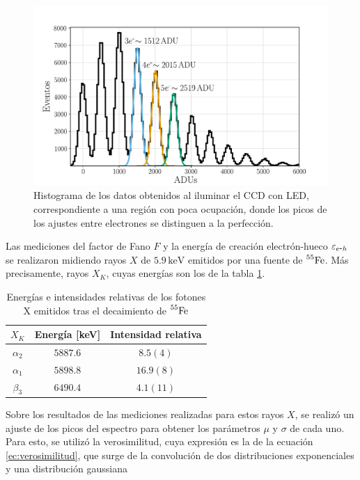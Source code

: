 \begin{figure}[H]
    \centering
        \includegraphics[scale=0.5]{Figs/ajuste_gaussiano_calibracion.pdf}
    \caption{\footnotesize{Histograma de los datos obtenidos al iluminar el CCD con LED, correspondiente a una región con poca ocupación, donde los picos de los ajustes entre electrones se distinguen a la perfección.}}
    \label{fig:Calibracion}
\end{figure}
Las mediciones del factor de Fano $F$ y la energía de creación electrón-hueco $\varepsilon_{e\mbox{-}h}$ se realizaron midiendo rayos $X$ de $5.9\,\si{\mbox{keV}}$ emitidos por una fuente de $\prescript{55}{}{\mbox{Fe}}$. Más precisamente, rayos $X_{K}$, cuyas energías son los de la tabla \ref{tab:EnergiasXk}.
\begin{table}[h]
\centering
\begin{tabular}{@{}ccc@{}}
\toprule
$X_{K}$         &   Energía [keV]   &   Intensidad relativa \\ \hline \hline
$\alpha_{2}$    &   $5887.6$        &   $8.5 (4)$           \\
$\alpha_{1}$    &   $5898.8$        &   $16.9 (8)$          \\
$\beta_{3}$     &   $6490.4$        &   $4.1 (11)$          \\ \bottomrule
\end{tabular}
\caption{\footnotesize{Energías e intensidades relativas de los fotones X emitidos tras el decaimiento de $\prescript{55}{}{\mbox{Fe}}$}}
\label{tab:EnergiasXk}
\end{table}
Sobre los resultados de las mediciones realizadas para estos rayos $X$, se realizó un ajuste de los picos del espectro para obtener los parámetros $\mu$ y $\sigma$ de cada uno. Para esto, se utilizó la verosimilitud, cuya expresión es la de la ecuación \eqref{ec:verosimilitud}, que surge de la convolución de dos distribuciones exponenciales y una distribución gaussiana
